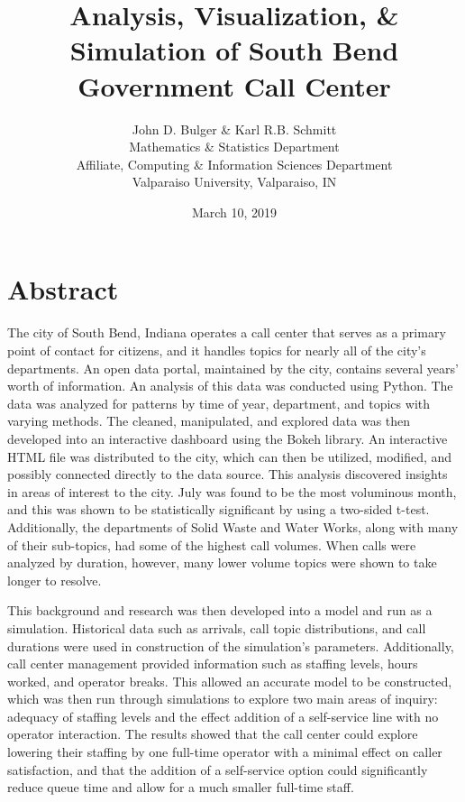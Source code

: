 \documentclass[12pt]{article}
\title{Analysis, Visualization, \& Simulation of South Bend Government Call Center}
\author{John D. Bulger \& Karl R.B. Schmitt\\
	Mathematics \& Statistics Department\\
	Affiliate, Computing \& Information Sciences Department
	\\Valparaiso University, Valparaiso, IN}
\date{March 10, 2019}
\begin{document}
	\maketitle
	
\section*{Abstract}

The city of South Bend, Indiana operates a call center that serves as a primary point of contact for citizens, and it handles topics for nearly all of the city's departments.  An open data portal, maintained by the city, contains several years’ worth of information.  An analysis of this data was conducted using Python.  The data was analyzed for patterns by time of year, department, and topics with varying methods.  The cleaned, manipulated, and explored data was then developed into an interactive dashboard using the Bokeh library.  An interactive HTML file was distributed to the city, which can then be utilized, modified, and possibly connected directly to the data source.  This analysis discovered insights in areas of interest to the city.  July was found to be the most voluminous month, and this was shown to be statistically significant by using a two-sided t-test.  Additionally, the departments of Solid Waste and Water Works, along with many of their sub-topics, had some of the highest call volumes.  When calls were analyzed by duration, however, many lower volume topics were shown to take longer to resolve.

\par

This background and research was then developed into a model and run as a simulation.  Historical data such as arrivals, call topic distributions, and call durations were used in construction of the simulation's parameters.  Additionally, call center management provided information such as staffing levels, hours worked, and operator breaks.  This allowed an accurate model to be constructed, which was then run through simulations to explore two main areas of inquiry:  adequacy of staffing levels and the effect addition of a self-service line with no operator interaction.  The results showed that the call center could explore lowering their staffing by one full-time operator with a minimal effect on caller satisfaction, and that the addition of a self-service option could significantly reduce queue time and allow for a much smaller full-time staff.

 
\end{document}
